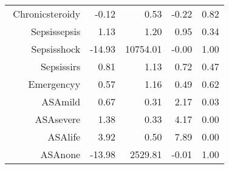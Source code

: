 \begin{tabular}{rrrrr}
$$  Chronic\-steroid\-y & -0.12 & 0.53 & -0.22 & 0.82 \\ 
  Sepsis\-sepsis & 1.13 & 1.20 & 0.95 & 0.34 \\ 
  Sepsis\-shock & -14.93 & 10754.01 & -0.00 & 1.00 \\ 
  Sepsis\-sirs & 0.81 & 1.13 & 0.72 & 0.47 \\ 
  Emergency\-y & 0.57 & 1.16 & 0.49 & 0.62 \\ 
  ASA\-mild & 0.67 & 0.31 & 2.17 & 0.03 \\ 
  ASA\-severe & 1.38 & 0.33 & 4.17 & 0.00 \\ 
  ASA\-life & 3.92 & 0.50 & 7.89 & 0.00 \\ 
  ASA\-none & -13.98 & 2529.81 & -0.01 & 1.00 \\ 
   \hline
\end{tabular}

